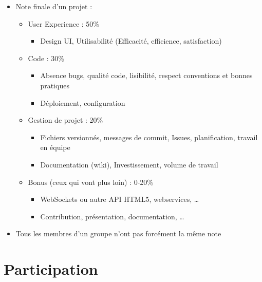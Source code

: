 \begin{itemize}
\tightlist
\item
  Note finale d'un projet :

  \begin{itemize}
  \tightlist
  \item
    User Experience : 50\%

    \begin{itemize}
    \tightlist
    \item
      Design UI, Utilisabilité (Efficacité, efficience, satisfaction)
    \end{itemize}
  \item
    Code : 30\%

    \begin{itemize}
    \tightlist
    \item
      Absence bugs, qualité code, lisibilité, respect conventions et
      bonnes pratiques
    \item
      Déploiement, configuration
    \end{itemize}
  \item
    Gestion de projet : 20\%

    \begin{itemize}
    \tightlist
    \item
      Fichiers versionnés, messages de commit, Issues, planification,
      travail en équipe
    \item
      Documentation (wiki), Investissement, volume de travail
    \end{itemize}
  \item
    Bonus (ceux qui vont plus loin) : 0-20\%

    \begin{itemize}
    \tightlist
    \item
      WebSockets ou autre API HTML5, webservices, \ldots{}
    \item
      Contribution, présentation, documentation, \ldots{}
    \end{itemize}
  \end{itemize}
\item
  {Tous les membres d'un groupe n'ont pas forcément la même note}
\end{itemize}

\hypertarget{participation}{%
\section{Participation}\label{participation}}

